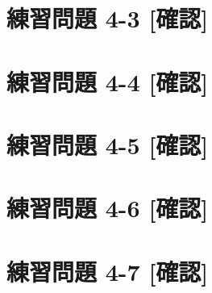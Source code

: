 \documentclass[
]{book}
\newenvironment{Shaded}{\begin{snugshade}}{\end{snugshade}}
\newcommand{\DecValTok}[1]{\textcolor[rgb]{0.00,0.00,0.81}{#1}}
\newcommand{\DocumentationTok}[1]{\textcolor[rgb]{0.56,0.35,0.01}{\textbf{\textit{#1}}}}
\newcommand{\FunctionTok}[1]{\textcolor[rgb]{0.13,0.29,0.53}{\textbf{#1}}}
\newcommand{\NormalTok}[1]{#1}
\newcommand{\OtherTok}[1]{\textcolor[rgb]{0.56,0.35,0.01}{#1}}
\newcommand{\SpecialCharTok}[1]{\textcolor[rgb]{0.81,0.36,0.00}{\textbf{#1}}}
\begin{document}
\begin{Shaded}
\end{Shaded}

\hypertarget{ux7df4ux7fd2ux554fux984c-4-3-ux78baux8a8d}{%
\section*{練習問題 4-3 {[}確認{]}}\label{ux7df4ux7fd2ux554fux984c-4-3-ux78baux8a8d}}

\hypertarget{ux7df4ux7fd2ux554fux984c-4-4-ux78baux8a8d}{%
\section*{練習問題 4-4 {[}確認{]}}\label{ux7df4ux7fd2ux554fux984c-4-4-ux78baux8a8d}}

\hypertarget{ux7df4ux7fd2ux554fux984c-4-5-ux78baux8a8d}{%
\section*{練習問題 4-5 {[}確認{]}}\label{ux7df4ux7fd2ux554fux984c-4-5-ux78baux8a8d}}

\hypertarget{ux7df4ux7fd2ux554fux984c-4-6-ux78baux8a8d}{%
\section*{練習問題 4-6 {[}確認{]}}\label{ux7df4ux7fd2ux554fux984c-4-6-ux78baux8a8d}}

\hypertarget{ux7df4ux7fd2ux554fux984c-4-7-ux78baux8a8d}{%
\section*{練習問題 4-7 {[}確認{]}}\label{ux7df4ux7fd2ux554fux984c-4-7-ux78baux8a8d}}
\end{document}
